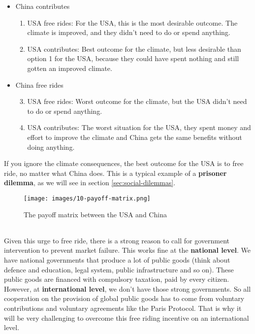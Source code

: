 \documentclass[../summary.tex]{subfiles}
\begin{document}
\begin{itemize}
	\item China contributes
	      \begin{enumerate}
		      \item USA free rides: For the USA, this is the most desirable outcome. The climate is improved, and they didn't need to do or spend anything.
		      \item USA contributes: Best outcome for the climate, but less desirable than option 1 for the USA, because they could have spent nothing and still gotten an improved climate.
	      \end{enumerate}
	\item China free rides
	      \begin{enumerate}
		      \setcounter{enumi}{2}
		      \item USA free rides: Worst outcome for the climate, but the USA didn't need to do or spend anything.
		      \item USA contributes: The worst situation for the USA, they spent money and effort to improve the climate and China gets the same benefits without doing anything.
	      \end{enumerate}
\end{itemize}
If you ignore the climate consequences, the best outcome for the USA is to free ride, no matter what China does. This is a typical example of a \textbf{prisoner dilemma}, as we will see in section \ref{sec:social-dilemmas}.

\begin{figure}[htbp]
	\centering
	\texttt{[image: images/10-payoff-matrix.png]}
	\caption{The payoff matrix between the USA and China}
	\label{fig:payoff-matrix}
\end{figure}

\ \\
Given this urge to free ride, there is a strong reason to call for government intervention to prevent market failure. This works fine at the \textbf{national level}. We have national governments that produce a lot of public goods (think about defence and education, legal system, public infrastructure and so on). These public goods are financed with compulsory taxation, paid by every citizen. However, at \textbf{international level}, we don't have those strong governments. So all cooperation on the provision of global public goods has to come from voluntary contributions and voluntary agreements like the Paris Protocol. That is why it will be very challenging to overcome this free riding incentive on an international level.
\end{document}
